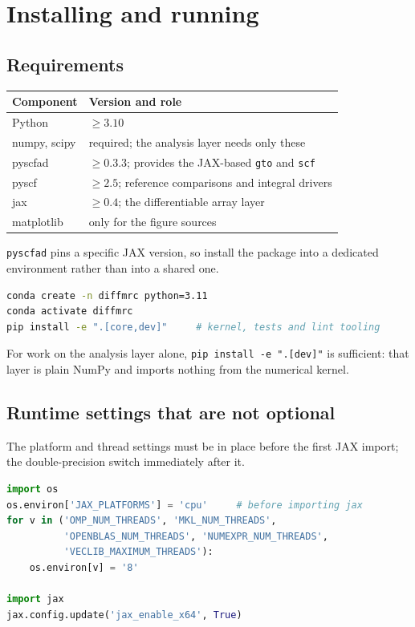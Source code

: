 \section{Installing and running}
\label{sec:installation}

\subsection{Requirements}

\begin{center}
\begin{tabular}{ll}
\toprule
Component & Version and role \\
\midrule
Python & $\geq 3.10$ \\
numpy, scipy & required; the analysis layer needs only these \\
pyscfad & $\geq 0.3.3$; provides the JAX-based \texttt{gto} and \texttt{scf} \\
pyscf & $\geq 2.5$; reference comparisons and integral drivers \\
jax & $\geq 0.4$; the differentiable array layer \\
matplotlib & only for the figure sources \\
\bottomrule
\end{tabular}
\end{center}

\texttt{pyscfad} pins a specific JAX version, so install the package
into a dedicated environment rather than into a shared one.

\begin{lstlisting}[language=bash]
conda create -n diffmrc python=3.11
conda activate diffmrc
pip install -e ".[core,dev]"     # kernel, tests and lint tooling
\end{lstlisting}

For work on the analysis layer alone, \texttt{pip install -e ".[dev]"}
is sufficient: that layer is plain NumPy and imports nothing from the
numerical kernel.

\subsection{Runtime settings that are not optional}

The platform and thread settings must be in place before the first
JAX import; the double-precision switch immediately after it.

\begin{lstlisting}[language=Python]
import os
os.environ['JAX_PLATFORMS'] = 'cpu'     # before importing jax
for v in ('OMP_NUM_THREADS', 'MKL_NUM_THREADS',
          'OPENBLAS_NUM_THREADS', 'NUMEXPR_NUM_THREADS',
          'VECLIB_MAXIMUM_THREADS'):
    os.environ[v] = '8'

import jax
jax.config.update('jax_enable_x64', True)
\end{lstlisting}

